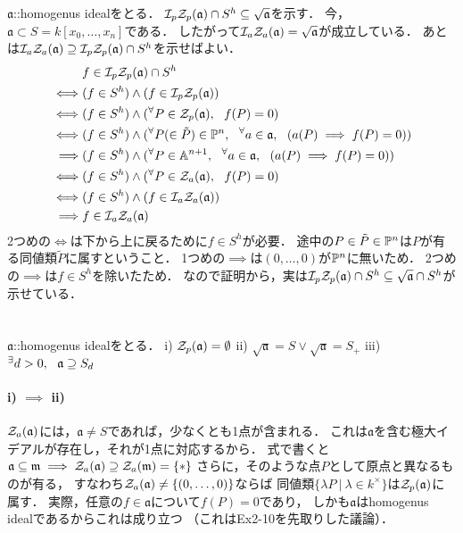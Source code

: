 \documentclass[a4paper]{jarticle}
\newcommand{\I}[1]{\mathfrak{#1}}
\begin{document}
\section{} %
    $\I{a}$::homogenus idealをとる．
    $\defsp \zerosp(\I{a}) \cap S^h \subseteq \sqrt{\I{a}}$を示す．
    今，$\I{a} \subset S=k[x_0,\dots,x_n]$である．
    したがって$\defsa \zerosa(\I{a})=\sqrt{\I{a}}$が成立している．
    あとは$\defsa \zerosa(\I{a}) \supseteq \defsp \zerosp(\I{a}) \cap S^h$を示せばよい．
    \begin{align*}
        {}&     f \in \defsp \zerosp(\I{a}) \cap S^h \\
        \iff&   (f \in S^h) \land (f \in \defsp \zerosp(\I{a})) \\
        \iff&   (f \in S^h) \land ( \Forall{P \in \zerosp(\I{a})} f(P)=0 ) \\
        \iff&   (f \in S^h) \land ( \Forall{P (\in \tilde{P} )\in \proj^{n}} \Forall{a \in \I{a}} (a(P) \implies f(P)=0) ) \\
        \implies&
                (f \in S^h) \land ( \Forall{P \in \affine^{n+1}} \Forall{a \in \I{a}} (a(P) \implies f(P)=0) ) \\
        \iff&   (f \in S^h) \land ( \Forall{P \in \zerosa(\I{a})} f(P)=0 ) \\
        \iff&   (f \in S^h) \land ( f \in \defsa \zerosa(\I{a}) ) \\
        \implies&   f \in \defsa \zerosa(\I{a})
    \end{align*}
    2つめの$\iff$は下から上に戻るために$f \in S^h$が必要．
    途中の$P \in \tilde{P} \in \mathbb{P}^{n}$は$P$が有る同値類$\tilde{P}$に属すということ．
    1つめの$\implies$は$(0,\dots,0)$が$\mathbb{P}^n$に無いため．
    2つめの$\implies$は$f \in S^h$を除いたため．
    なので証明から，実は$\defsp \zerosp(\I{a}) \cap S^h \subseteq \sqrt{\I{a}} \cap S^h$が示せている．

\section{} %
    $\I{a}$::homogenus idealをとる．
    i) $\zerosp(\I{a})=\emptyset$
    ii) $\sqrt{\I{a}}=S \lor \sqrt{\I{a}}=S_{+}$
    iii) $\Exists{d>0} \I{a} \supseteq S_d$

    \paragraph{i) $\implies$ ii)}
    $\zerosa(\I{a})$には，$\I{a} \neq S$であれば，少なくとも1点が含まれる．
    これは$\I{a}$を含む極大イデアルが存在し，それが1点に対応するから．
    式で書くと$\I{a} \subseteq \I{m} \implies \zerosa(\I{a}) \supseteq \zerosa(\I{m})=\{ \ast \}$
    さらに，そのような点$P$として原点と異なるものが有る，
    すなわち$\zerosa(\I{a}) \neq \{(0,\dots,0)\}$ならば
    同値類$\{ \lambda P ~|~ \lambda \in k^{\times} \}$は$\zerosp(\I{a})$に属す．
    実際，任意の$f \in \I{a}$について$f(P)=0$であり，
    しかも$\I{a}$はhomogenus idealであるからこれは成り立つ
    （これはEx2-10を先取りした議論）．
\end{document}
